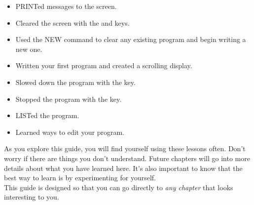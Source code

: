 \begin{itemize}

	\item {\ttfamily PRINT}ed messages to the screen.

	\item Cleared the screen with the \shiftkey and \clrhomekey keys.

	\item Used the {\ttfamily NEW} command to clear any existing program and
		begin writing a new one.
	
	\item Written your first program and created a scrolling display.
	
	\item Slowed down the program with the \ctrlkey key.

	\item Stopped the program with the \runstopkey key.

	\item {\ttfamily LIST}ed the program.

	\item Learned ways to edit your program.

\end{itemize}

\vspace{16pt}

As you explore this guide, you will find yourself using these lessons often.
Don't worry if there are things you don't understand.  Future chapters will go
into more details about what you have learned here.  It's also important to
know that the best way to learn is by experimenting for yourself.\\

This guide is designed so that you can go directly to \emph{any chapter} that
looks interesting to you.


\@openrighttrue\makeatother
